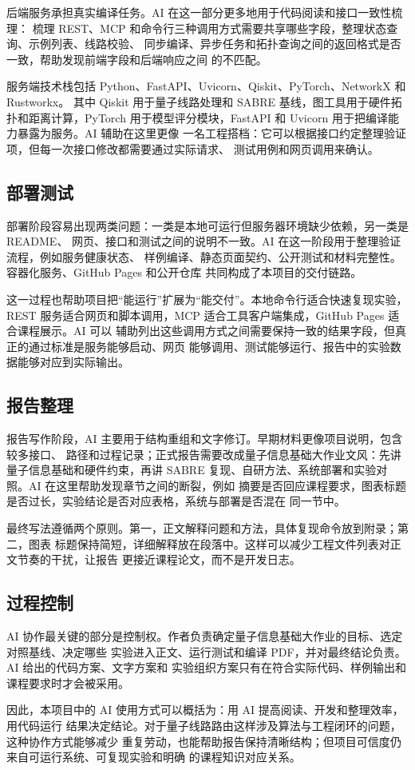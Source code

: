 后端服务承担真实编译任务。AI 在这一部分更多地用于代码阅读和接口一致性梳理：
梳理 REST、MCP 和命令行三种调用方式需要共享哪些字段，整理状态查询、示例列表、线路校验、
同步编译、异步任务和拓扑查询之间的返回格式是否一致，帮助发现前端字段和后端响应之间
的不匹配。

服务端技术栈包括 Python、FastAPI、Uvicorn、Qiskit、PyTorch、NetworkX 和 Rustworkx。
其中 Qiskit 用于量子线路处理和 SABRE 基线，图工具用于硬件拓扑和距离计算，PyTorch
用于模型评分模块，FastAPI 和 Uvicorn 用于把编译能力暴露为服务。AI 辅助在这里更像
一名工程搭档：它可以根据接口约定整理验证项，但每一次接口修改都需要通过实际请求、
测试用例和网页调用来确认。

\subsection{部署测试}

部署阶段容易出现两类问题：一类是本地可运行但服务器环境缺少依赖，另一类是 README、
网页、接口和测试之间的说明不一致。AI 在这一阶段用于整理验证流程，例如服务健康状态、
样例编译、静态页面契约、公开测试和材料完整性。容器化服务、GitHub Pages 和公开仓库
共同构成了本项目的交付链路。

这一过程也帮助项目把“能运行”扩展为“能交付”。本地命令行适合快速复现实验，REST
服务适合网页和脚本调用，MCP 适合工具客户端集成，GitHub Pages 适合课程展示。AI 可以
辅助列出这些调用方式之间需要保持一致的结果字段，但真正的通过标准是服务能够启动、网页
能够调用、测试能够运行、报告中的实验数据能够对应到实际输出。

\subsection{报告整理}

报告写作阶段，AI 主要用于结构重组和文字修订。早期材料更像项目说明，包含较多接口、
路径和过程记录；正式报告需要改成量子信息基础大作业文风：先讲量子信息基础和硬件约束，再讲
SABRE 复现、自研方法、系统部署和实验对照。AI 在这里帮助发现章节之间的断裂，例如
摘要是否回应课程要求，图表标题是否过长，实验结论是否对应表格，系统与部署是否混在
同一节中。

最终写法遵循两个原则。第一，正文解释问题和方法，具体复现命令放到附录；第二，图表
标题保持简短，详细解释放在段落中。这样可以减少工程文件列表对正文节奏的干扰，让报告
更接近课程论文，而不是开发日志。

\subsection{过程控制}

AI 协作最关键的部分是控制权。作者负责确定量子信息基础大作业的目标、选定对照基线、决定哪些
实验进入正文、运行测试和编译 PDF，并对最终结论负责。AI 给出的代码方案、文字方案和
实验组织方案只有在符合实际代码、样例输出和课程要求时才会被采用。

因此，本项目中的 AI 使用方式可以概括为：用 AI 提高阅读、开发和整理效率，用代码运行
结果决定结论。对于量子线路路由这样涉及算法与工程闭环的问题，这种协作方式能够减少
重复劳动，也能帮助报告保持清晰结构；但项目可信度仍来自可运行系统、可复现实验和明确
的课程知识对应关系。
